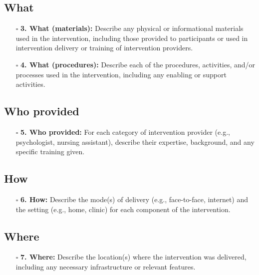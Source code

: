 \documentclass[11pt]{article}
\def\tightlist{}
\begin{document}
\begin{Form}
\subsection{What}\label{what}

\begin{itemize}
\tightlist
\item[$\square$]
  \textbf{3. What (materials):} Describe any physical or informational
  materials used in the intervention, including those provided to
  participants or used in intervention delivery or training of
  intervention providers.
\item[$\square$]
  \textbf{4. What (procedures):} Describe each of the procedures,
  activities, and/or processes used in the intervention, including any
  enabling or support activities.
\end{itemize}

\subsection{Who provided}\label{who-provided}

\begin{itemize}
\tightlist
\item[$\square$]
  \textbf{5. Who provided:} For each category of intervention provider
  (e.g., psychologist, nursing assistant), describe their expertise,
  background, and any specific training given.
\end{itemize}

\subsection{How}\label{how}

\begin{itemize}
\tightlist
\item[$\square$]
  \textbf{6. How:} Describe the mode(s) of delivery (e.g., face-to-face,
  internet) and the setting (e.g., home, clinic) for each component of
  the intervention.
\end{itemize}

\subsection{Where}\label{where}

\begin{itemize}
\tightlist
\item[$\square$]
  \textbf{7. Where:} Describe the location(s) where the intervention was
  delivered, including any necessary infrastructure or relevant
  features.
\end{itemize}


\end{Form}
\end{document}

